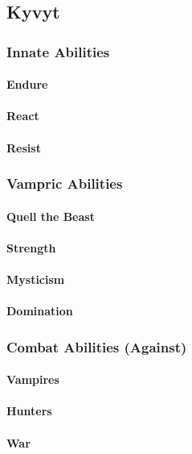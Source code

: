 \documentclass[a4paper, 12pt, finnish]{report}
\begin{document}
{	\subsection{Kyvyt}
		\subsubsection{Innate Abilities}
			\paragraph{Endure}
			\paragraph{React}
			\paragraph{Resist}
		\subsubsection{Vampric Abilities}
			\paragraph{Quell the Beast}
			\paragraph{Strength}
			\paragraph{Mysticism}
			\paragraph{Domination}
		\subsubsection{Combat Abilities (Against)}
			\paragraph{Vampires}
			\paragraph{Hunters}
			\paragraph{War}
}
\end{document}
